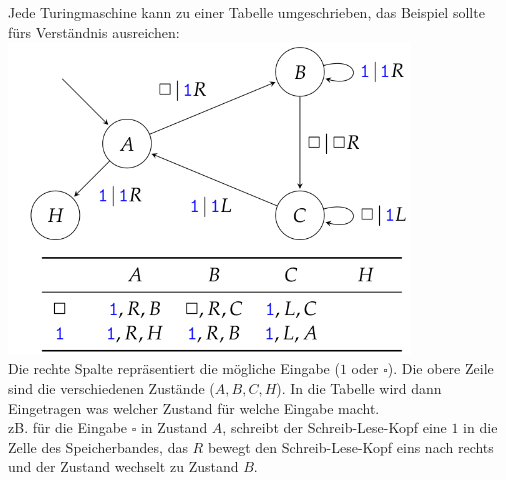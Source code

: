 \documentclass[12pt]{article}
\begin{document}
\begin{flushleft}
    Jede Turingmaschine kann zu einer Tabelle umgeschrieben, das Beispiel sollte fürs Verständnis ausreichen:
    \includegraphics[width=0.8\textwidth]{turing_table.png} \\
    Die rechte Spalte repräsentiert die mögliche Eingabe ($1$ oder $\square$). Die obere Zeile sind die verschiedenen Zustände ($A,B,C,H$).
    In die Tabelle wird dann Eingetragen was welcher Zustand für welche Eingabe macht. \\
    zB. für die Eingabe $\square$ in Zustand $A$, schreibt der Schreib-Lese-Kopf eine $1$ in die Zelle des Speicherbandes, das $R$ bewegt den Schreib-Lese-Kopf eins nach rechts und der Zustand wechselt zu Zustand $B$.
\end{flushleft}
\end{document}
